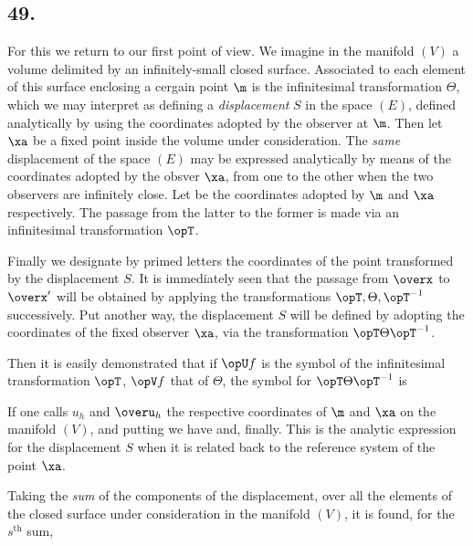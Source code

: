 \subsection*{49.}


For this we return to our first point of view. We imagine in the manifold $(V)$ a volume delimited by an infinitely-small closed surface. Associated to each element of this surface enclosing a cergain point $\m$ is the infinitesimal transformation $\Theta$, 
which we may interpret as defining a \textit{displacement} $S$ in the space $(E)$, defined analytically by using the coordinates adopted by the observer at $\m$. Then let $\xa$ be a fixed point inside the volume under consideration. The \textit{same} displacement of the space $(E)$ may be expressed analytically by means of the coordinates adopted by the obsver $\xa$,  from one to the other when the two observers are infinitely close. Let
be the coordinates adopted by $\m$ and $\xa$ respectively. The passage from the latter to the former is made via an infinitesimal transformation $\opT$.

Finally we designate by primed letters the coordinates of the point transformed by the displacement $S$. It is immediately seen that the passage from $\overx$ to $\overx'$ will be obtained by applying the transformations $\opT, \Theta, \opT^{-1}$ successively. Put another way, the displacement $S$ will be defined by adopting the coordinates of the fixed observer $\xa$, via the transformation $\opT\Theta\opT^{-1}$.

Then it is easily demonstrated that if $\opU f$ is the symbol of the infinitesimal transformation $\opT$, $\opV f$ that of $\Theta$, the symbol for $\opT\Theta\opT^{-1}$ is

If one calls $u_h$ and $\overu_h$ the respective coordinates of $\m$ and $\xa$ on the manifold $(V)$, and putting
we have
and, finally.
This is the analytic expression for the displacement $S$ when it is related back to the reference system of the point $\xa$.

Taking the \textit{sum} of the components of the displacement, over all the elements of the closed surface under consideration in the manifold $(V)$, it is found, for the $s^\text{th}$ sum,
